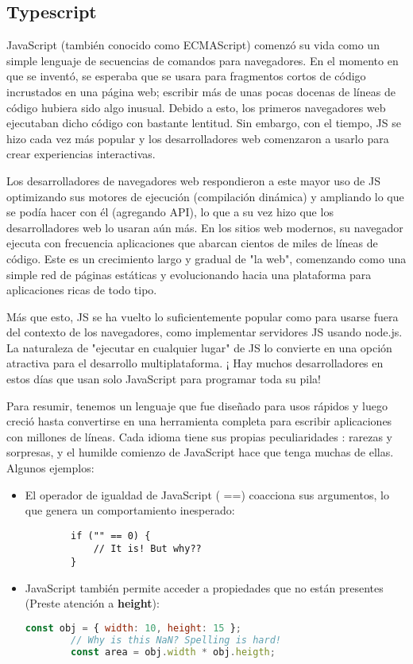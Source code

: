 \begin{enumerate}
\section{Typescript}

\cite{type} JavaScript (también conocido como ECMAScript) comenzó su vida como un simple lenguaje de secuencias de comandos para navegadores. En el momento en que se inventó, se esperaba que se usara para fragmentos cortos de código incrustados en una página web; escribir más de unas pocas docenas de líneas de código hubiera sido algo inusual. Debido a esto, los primeros navegadores web ejecutaban dicho código con bastante lentitud. Sin embargo, con el tiempo, JS se hizo cada vez más popular y los desarrolladores web comenzaron a usarlo para crear experiencias interactivas.

Los desarrolladores de navegadores web respondieron a este mayor uso de JS optimizando sus motores de ejecución (compilación dinámica) y ampliando lo que se podía hacer con él (agregando API), lo que a su vez hizo que los desarrolladores web lo usaran aún más. En los sitios web modernos, su navegador ejecuta con frecuencia aplicaciones que abarcan cientos de miles de líneas de código. Este es un crecimiento largo y gradual de "la web", comenzando como una simple red de páginas estáticas y evolucionando hacia una plataforma para aplicaciones ricas de todo tipo.

Más que esto, JS se ha vuelto lo suficientemente popular como para usarse fuera del contexto de los navegadores, como implementar servidores JS usando node.js. La naturaleza de "ejecutar en cualquier lugar" de JS lo convierte en una opción atractiva para el desarrollo multiplataforma. ¡ Hay muchos desarrolladores en estos días que usan solo JavaScript para programar toda su pila!

Para resumir, tenemos un lenguaje que fue diseñado para usos rápidos y luego creció hasta convertirse en una herramienta completa para escribir aplicaciones con millones de líneas. Cada idioma tiene sus propias peculiaridades : rarezas y sorpresas, y el humilde comienzo de JavaScript hace que tenga muchas de ellas. Algunos ejemplos:

\begin{itemize}
	\item El operador de igualdad de JavaScript ( ==) coacciona sus argumentos, lo que genera un comportamiento inesperado:
	\begin{lstlisting}
		if ("" == 0) {
			// It is! But why??
		}
	\end{lstlisting}
	\item JavaScript también permite acceder a propiedades que no están presentes (Preste atención a \textbf{height}):
	\begin{lstlisting}[language=javascript]
		const obj = { width: 10, height: 15 };
		// Why is this NaN? Spelling is hard!
		const area = obj.width * obj.heigth;
	\end{lstlisting}
\end{itemize}


\end{enumerate}
